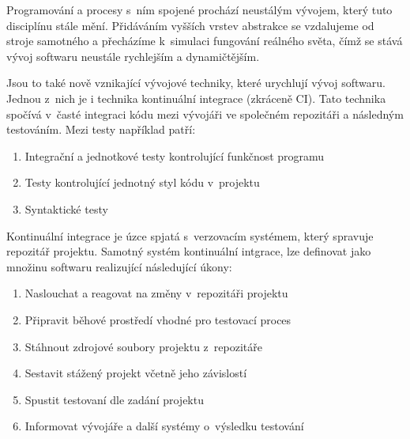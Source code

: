 \begin{introduction}

Programování a procesy s~ním spojené prochází neustálým vývojem, který tuto disciplínu stále mění. 
Přidáváním vyšších vrstev abstrakce se vzdalujeme od stroje samotného a přecházíme k~simulaci fungování reálného světa, čímž se stává vývoj softwaru neustále rychlejším a dynamičtějším. 

Jsou to také nově vznikající vývojové techniky, které urychlují vývoj softwaru.
Jednou z~nich je i technika kontinuální integrace (zkráceně CI).
Tato technika spočívá v~časté integraci kódu mezi vývojáři ve společném repozitáři a následným testováním. 
Mezi testy například patří:

\begin{enumerate}
	\item Integrační a jednotkové testy kontrolující funkčnost programu
	\item Testy kontrolující jednotný styl kódu v~projektu
	\item Syntaktické testy
\end{enumerate}

Kontinuální integrace je úzce spjatá s~verzovacím systémem, který spravuje repozitář projektu.
Samotný systém kontinuální intgrace, lze definovat jako množinu softwaru realizující následující úkony:

\begin{enumerate}
	\item Naslouchat a reagovat na změny v~repozitáři projektu
	\item Připravit běhové prostředí vhodné pro testovací proces
	\item Stáhnout zdrojové soubory projektu z~repozitáře
	\item Sestavit stážený projekt včetně jeho závislostí
	\item Spustit testovaní dle zadání projektu
	\item Informovat vývojáře a další systémy o~výsledku testování
\end{enumerate}

\end{introduction}
